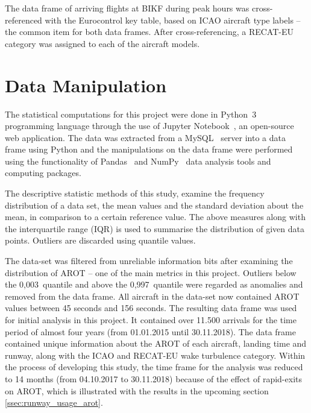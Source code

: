 The data frame of arriving flights at BIKF during peak hours was cross-referenced with the Eurocontrol key table, based on ICAO aircraft type labels -- the common item for both data frames. After cross-referencing, a RECAT-EU category was assigned to each of the aircraft models.

\section{Data Manipulation}

The statistical computations for this project were done in Python~3~\cite{python} programming language through the use of Jupyter Notebook~\cite{jupyter}, an open-source web application. The data was extracted from a MySQL~\cite{mysql} server into a data frame using Python and the manipulations on the data frame were performed using the functionality of Pandas~\cite{pandas} and NumPy~\cite{numpy} data analysis tools and computing packages.

The descriptive statistic methods of this study, examine the frequency distribution of a data set, the mean values and the standard deviation about the mean, in comparison to a certain reference value. The above measures along with the interquartile range (IQR) is used to summarise the distribution of given data points. Outliers are discarded using quantile values.

The data-set was filtered from unreliable information bits after examining the distribution of AROT -- one of the main metrics in this project. Outliers below the 0,003~quantile and above the 0,997~quantile were regarded as anomalies and removed from the data frame. All aircraft in the data-set now contained AROT values between 45 seconds and 156 seconds. The resulting data frame was used for initial analysis in this project. It contained over 11.500 arrivals for the time period of almost four years (from 01.01.2015 until 30.11.2018). The data frame contained unique information about the AROT of each aircraft, landing time and runway, along with the ICAO and RECAT-EU wake turbulence category. Within the process of developing this study, the time frame for the analysis was reduced to 14 months (from 04.10.2017 to 30.11.2018) because of the effect of rapid-exits on AROT, which is illustrated with the results in the upcoming section \ref{ssec:runway_usage_arot}.



